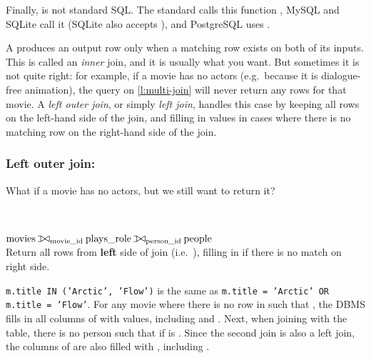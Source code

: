 {\begin{enumerate}
            Finally,  is not standard SQL.
            The standard calls this function , MySQL and SQLite call it  (SQLite also accepts ), and PostgreSQL uses .
    \end{enumerate}
}

A  produces an output row only when a matching row exists on both of its inputs.
This is called an \emph{inner} join, and it is usually what you want.
But sometimes it is not quite right: for example, if a movie has no actors (e.g.\ because it is dialogue-free animation), the query on \autoref{l:multi-join} will never return any rows for that movie.
A \emph{left outer join}, or simply \emph{left join}, handles this case by keeping all rows on the left-hand side of the join, and filling in  values in cases where there is no matching row on the right-hand side of the join.

\begin{frame}
    \label{s:left-join}
    \frametitle{Left outer join: }
    What if a movie has no actors, but we still want to return it?
    \inputminted[fontsize=\footnotesize]{sql}{code/sql-left-join.sql}
    \vspace{0.4em}
    {\footnotesize}\\[0.7em]\pause
    $\ra{movies} \rabin{\louterjoin}_{\ra{movie\_id}} \ra{plays\_role}
      \rabin{\louterjoin}_{\ra{person\_id}} \ra{people}$\\[1em]
    Return all rows from \textbf{left} side of join (i.e.\ ),
    filling in  if there is no match on right side.
\end{frame}
\label{l:left-join}

\texttt{m.title IN ('Arctic', 'Flow')} is the same as \texttt{m.title = 'Arctic' OR m.title = 'Flow'}.
For any movie  where there is no row  in  such that , the DBMS fills in all columns of  with  values, including  and .
Next, when joining with the  table, there is no person  such that  if  is .
Since the second join is also a left join, the columns of  are also filled with , including .

